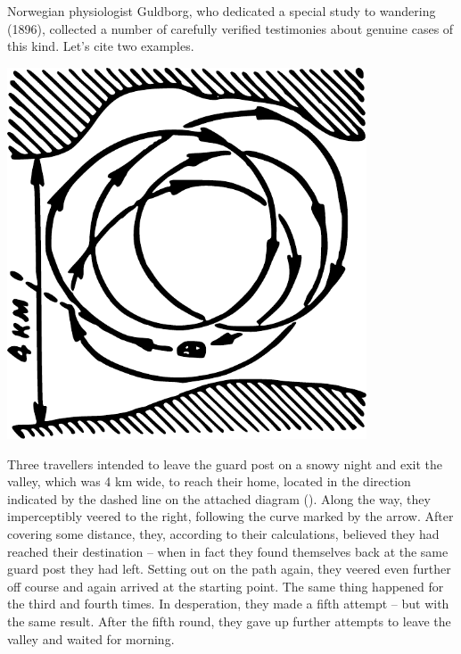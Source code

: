 Norwegian physiologist Guldborg, who dedicated a special study to wandering (1896), collected a number of carefully verified testimonies about genuine cases of this kind. Let's cite two examples.

\begin{marginfigure}%
\centering
\includegraphics[width=0.8\textwidth]{figures/ch-08/fig-113.pdf}
\end{marginfigure}


Three travellers intended to leave the guard post on a snowy night and exit the valley, which was 4 km wide, to reach their home, located in the direction indicated by the dashed line on the attached diagram (). Along the way, they imperceptibly veered to the right, following the curve marked by the arrow. After covering some distance, they, according to their calculations, believed they had reached their destination -- when in fact they found themselves back at the same guard post they had left. Setting out on the path again, they veered even further off course and again arrived at the starting point. The same thing happened for the third and fourth times. In desperation, they made a fifth attempt -- but with the same result. After the fifth round, they gave up further attempts to leave the valley and waited for morning.

